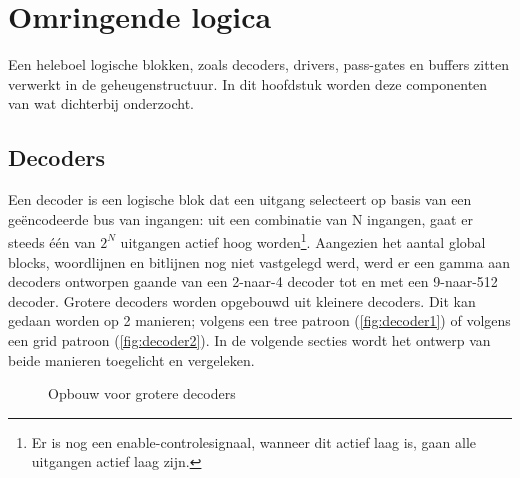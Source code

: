 \chapter{Omringende logica}
\label{periphery}

Een heleboel logische blokken, zoals decoders, drivers, pass-gates en buffers zitten verwerkt in de geheugenstructuur.
In dit hoofdstuk worden deze componenten van wat dichterbij onderzocht.

\section{Decoders}
Een decoder is een logische blok dat een uitgang selecteert op basis van een geëncodeerde bus van ingangen: uit een combinatie van N ingangen, gaat er steeds één van $2^N$ uitgangen actief hoog worden\footnote{Er is nog een enable-controlesignaal, wanneer dit actief laag is, gaan alle uitgangen actief laag zijn.}. Aangezien het aantal global blocks, woordlijnen en bitlijnen nog niet vastgelegd werd, werd er een gamma aan decoders ontworpen gaande van een 2-naar-4 decoder tot en met een 9-naar-512 decoder. Grotere decoders worden opgebouwd uit kleinere decoders. Dit kan gedaan worden op 2 manieren; volgens een tree patroon (\ref{fig:decoder1}) of volgens een grid patroon (\ref{fig:decoder2}). In de volgende secties wordt het ontwerp van beide manieren toegelicht en vergeleken.

\begin{figure}[!ht]
\centering
{}
\caption{Opbouw voor grotere decoders}\label{fig:basisdecoders}
\end{figure}

